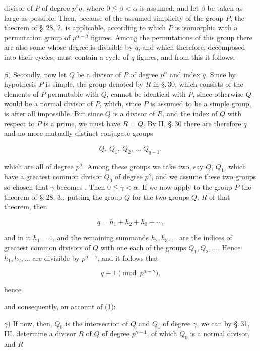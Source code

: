 divisor of $P$ of degree $p^{\beta} q$, where $0 \leqq \beta < \alpha$ is assumed, and let $\beta$ be taken as large as possible. Then, because of the assumed simplicity of the group $P$, the theorem of \S.\,28, 2. is applicable, according to which $P$ is isomorphic with a permutation group of $p^{\alpha-\beta}$ figures. Among the permutations of this group there are also some whose degree is divisible by $q$, and which therefore, decomposed into their cycles, must contain a cycle of $q$ figures, and from this it follows:


$\beta)$ Secondly, now let $Q$ be a divisor of $P$ of degree $p^{\alpha}$ and index $q$. Since by hypothesis $P$ is simple, the group denoted by $R$ in \S.\,30, which consists of the elements of $P$ permutable with $Q$, cannot be identical with $P$, since otherwise $Q$ would be a normal divisor of $P$, which, since $P$ is assumed to be a simple group, is after all impossible. But since $Q$ is a divisor of $R$, and the index of $Q$ with respect to $P$ is a prime, we must have $R = Q$. By II, \S.\,30 there are therefore $q$ and no more mutually distinct conjugate groups

\[ Q,\ Q_1,\ Q_2,\ \dots\ Q_{q-1}, \]

which are all of degree $p^{\alpha}$. Among these groups we take two, say $Q$, $Q_1$, which have a greatest common divisor $Q_0$ of degree $p^{\gamma}$, and we assume these two groups so chosen that $\gamma$ becomes . Then $0 \leqq \gamma < \alpha$. If we now apply to the group $P$ the theorem of \S.\,28, 3., putting the group $Q$ for the two groups $Q$, $R$ of that theorem, then

\[ q = h_1 + h_2 + h_3 + \cdots, \]

and in it $h_1 = 1$, and the remaining summands $h_2, h_3, \dots$ are the indices of greatest common divisors of $Q$ with one each of the groups $Q_1, Q_2, \dots$. Hence $h_1, h_2, \dots$ are divisible by $p^{\alpha-\gamma}$, %
and it follows that

\[ q \equiv 1 \pmod{p^{\alpha-\gamma}}, \]

hence


and consequently, on account of (1):


$\gamma)$ If now, then, $Q_0$ is the intersection of $Q$ and $Q_1$ of degree $\gamma$, %
we can by \S.\,31, III. determine a divisor $R$ of $Q$ of degree $p^{\gamma+1}$, of which $Q_0$ is a normal divisor, and $R$
